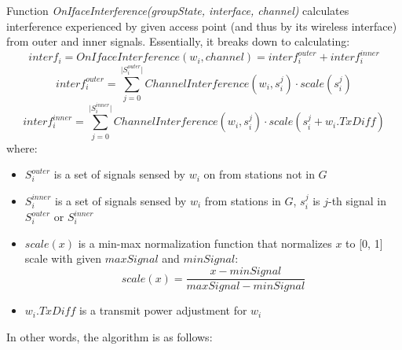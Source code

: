 Function \textit{OnIfaceInterference(groupState, interface, channel)} calculates interference experienced by given access point (and thus by its wireless interface) from outer and inner signals.
Essentially, it breaks down to calculating:
\begin{equation}
    interf_i = OnIfaceInterference(w_i, channel) = interf^{outer}_i + interf^{inner}_i
\end{equation}
\begin{equation}
    interf^{outer}_i = \sum_{j=0}^{\lvert S^{outer}_i \rvert} ChannelInterference(w_i, s^{j}_i) \cdot scale(s^j_i)
\end{equation}
\begin{equation}
    interf^{inner}_i = \sum_{j=0}^{\lvert S^{inner}_i \rvert} ChannelInterference(w_i, s^{j}_i) \cdot scale(s^j_i + w_i.TxDiff)
\end{equation}
where:
\begin{itemize}
    \item $S^{outer}_i$ is a set of signals sensed by $w_i$ on from stations not in $G$
    \item $S^{inner}_i$ is a set of signals sensed by $w_i$ from stations in $G$, $s^j_i$ is $j$-th signal in $S^{outer}_i$ or $S^{inner}_i$
    \item $scale(x)$ is a min-max normalization function that normalizes $x$ to [0, 1] scale with given $maxSignal$ and $minSignal$:
        \begin{equation} scale(x) = \frac{x - minSignal}{maxSignal - minSignal} \end{equation}
    \item $w_i.TxDiff$ is a transmit power adjustment for $w_i$
\end{itemize}
In other words, the algorithm is as follows:

